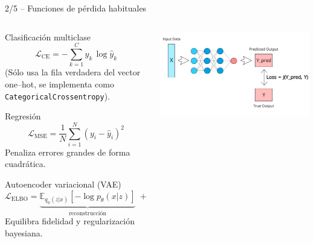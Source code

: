 \documentclass[8pt,spanish]{beamer}
\begin{document}
\begin{frame}[fragile]{2/5  --  Funciones de pérdida habituales}
  \begin{columns}[T]
    \begin{column}[T]{0.55\textwidth}\small
      \begin{block}{Clasificación multiclase}
        \[
          \mathcal{L}_{\text{CE}}
            = -\sum_{k=1}^{C} y_k \,\log \hat y_k
        \]
        \footnotesize
        (Sólo usa la fila verdadera del vector one--hot,
        se implementa como \verb|CategoricalCrossentropy|).
      \end{block}

      \begin{block}{Regresión}
        \[
          \mathcal{L}_{\text{MSE}}
            = \frac{1}{N}\sum_{i=1}^{N}
              \left(y_i - \hat y_i\right)^{2}
        \]
        \footnotesize
        Penaliza errores grandes de forma cuadrática.
      \end{block}

      \begin{block}{Autoencoder variacional (VAE)}
        \[
          \mathcal{L}_{\text{ELBO}}
            = \underbrace{\mathbb{E}_{q_\phi(z|x)}
                [-\log p_\theta(x|z)]}_{\text{reconstrucción}}
              \;+\;
              \underbrace{\text{KL}\!
                \bigl(q_\phi(z|x)\;\|\;p(z)\bigr)}_{\text{regularización}}
        \]
        \footnotesize
        Equilibra fidelidad y regularización bayesiana.
      \end{block}
    \end{column}

    \begin{column}[T]{0.45\textwidth}
      \parbox[c][0.9\textheight][c]{\linewidth}{%
        \centering
        \includegraphics[width=.9\linewidth]{loss_func.png}\par
        \vspace{0.4em}
        \scriptsize{}%
      }
    \end{column}
  \end{columns}
\end{frame}
\end{document}
